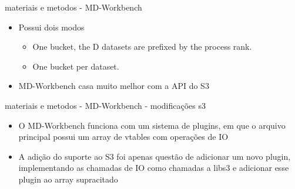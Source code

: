 \documentclass{beamer}
\begin{document}
\begin{frame}{materiais e metodos - MD-Workbench}
	\begin{itemize}
		\item Possui dois modos
		\begin{itemize}
			\item One bucket, the D datasets are prefixed by the process rank.
			\item One bucket per dataset.
		\end{itemize}
		\item	MD-Workbench casa muito melhor com a API do S3
	\end{itemize}
\end{frame}
\begin{frame}{materiais e metodos - MD-Workbench - modificações s3}
	\begin{itemize}
		\item 	O MD-Workbench funciona com um sistema de plugins, em que o arquivo principal possui um array de vtables com operações de IO
		\item	A adição do suporte ao S3 foi apenas questão de adicionar um novo plugin, implementando as chamadas de IO como chamadas a libs3 e adicionar esse plugin ao array supracitado
	\end{itemize}

\end{frame}
\end{document}
